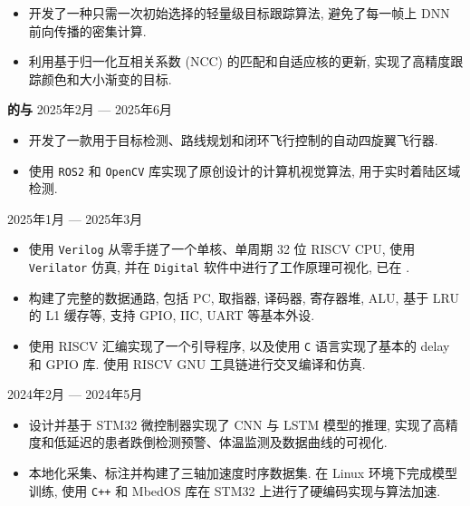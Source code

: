 \begin{itemize}
    \setlength\itemsep{-0.5em}
    \item 开发了一种只需一次初始选择的轻量级目标跟踪算法, 避免了每一帧上 DNN 前向传播的密集计算.
    \item 利用基于归一化互相关系数 (NCC) 的匹配和自适应核的更新, 实现了高精度跟踪颜色和大小渐变的目标.
\end{itemize}

\textbf{的与} \hfill 2025年2月 --- 2025年6月

\begin{itemize}
    \setlength\itemsep{-0.5em}
    \item 开发了一款用于目标检测、路线规划和闭环飞行控制的自动四旋翼飞行器.
    \item 使用 \texttt{ROS2} 和 \texttt{OpenCV} 库实现了原创设计的计算机视觉算法, 用于实时着陆区域检测.
\end{itemize}

 \hfill 2025年1月 --- 2025年3月

\begin{itemize}
    \setlength\itemsep{-0.5em}
    \item 使用 \texttt{Verilog} 从零手搓了一个单核、单周期 32 位 RISCV CPU, 使用 \texttt{Verilator} 仿真, 并在 \texttt{Digital} 软件中进行了工作原理可视化, 已在 .
    \item 构建了完整的数据通路, 包括 PC, 取指器, 译码器, 寄存器堆, ALU, 基于 LRU 的 L1 缓存等, 支持 GPIO, IIC, UART 等基本外设.
    \item 使用 RISCV 汇编实现了一个引导程序, 以及使用 \texttt{C} 语言实现了基本的 delay 和 GPIO 库. 使用 RISCV GNU 工具链进行交叉编译和仿真.
\end{itemize}

 \hfill 2024年2月 --- 2024年5月

\begin{itemize}
    \setlength\itemsep{-0.5em}
    \item 设计并基于 STM32 微控制器实现了 CNN 与 LSTM 模型的推理, 实现了高精度和低延迟的患者跌倒检测预警、体温监测及数据曲线的可视化.
    \item 本地化采集、标注并构建了三轴加速度时序数据集. 在 Linux 环境下完成模型训练, 使用 \texttt{C++} 和 MbedOS 库在 STM32 上进行了硬编码实现与算法加速.
\end{itemize}


